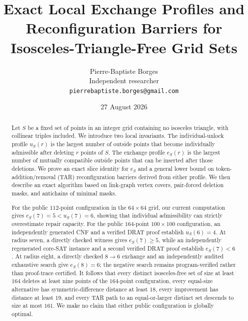 \documentclass[11pt]{article}
\title{Exact Local Exchange Profiles and Reconfiguration Barriers for
Isosceles-Triangle-Free Grid Sets}
\author{Pierre-Baptiste Borges\\[2pt]\small Independent researcher\\
  \small\texttt{pierrebaptiste.borges@gmail.com}}
\date{27 August 2026}
\theoremstyle{definition}
\theoremstyle{remark}
\begin{document}
\maketitle

\begin{abstract}
Let $S$ be a fixed set of points in an integer grid containing no isosceles
triangle, with collinear triples included.  We introduce two local invariants.
The individual-unlock profile $u_S(r)$ is the largest number of outside points
that become individually admissible after deleting $r$ points of $S$.  The
exchange profile $e_S(r)$ is the largest number of mutually compatible outside
points that can be inserted after those deletions.  We prove an exact slice
identity for $e_S$ and a general lower bound on token-addition/removal (TAR)
reconfiguration barriers derived from either profile.  We then describe an
exact algorithm based on link-graph vertex covers, pair-forced deletion masks,
and antichains of minimal masks.

For the public $112$-point configuration in the $64\times64$ grid, our current
computation gives $e_S(7)=5<u_S(7)=6$, showing that individual admissibility can
strictly overestimate repair capacity.  For the public $164$-point
$100\times100$ configuration, an independently generated CNF and a verified
DRAT proof establish $u_S(6)=4$.  At radius seven, a directly checked witness
gives $e_S(7)\ge5$, while an independently regenerated core-SAT instance and a
second verified DRAT proof establish $e_S(7)<6$.  At radius eight, a directly
checked $8\to6$ exchange and an independently audited exhaustive search give
$e_S(8)=6$; the negative search remains program-verified rather than
proof-trace certified.  It follows that every distinct isosceles-free set of
size at least $164$ deletes at least nine points of the $164$-point
configuration, every equal-size alternative has symmetric-difference distance
at least $18$, every improvement has distance at least $19$, and every TAR
path to an equal-or-larger distinct set descends to size at most $161$.  We
make no claim that either public configuration is globally optimal.
\end{abstract}

\begin{center}
\end{center}
\end{document}
